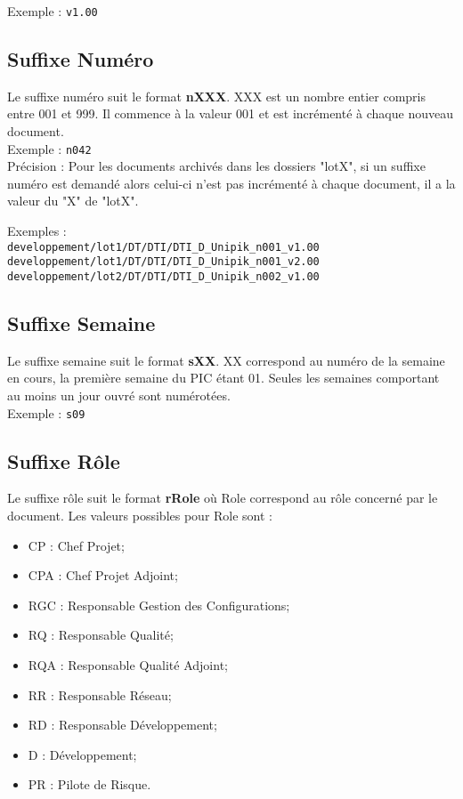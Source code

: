 Exemple : \verb+v1.00+

\subsection{Suffixe Numéro}
\label{suffixe_numero}

Le suffixe numéro suit le format \textbf{nXXX}. XXX est un nombre entier compris entre 001 et 999. Il commence à la valeur 001 et est incrémenté à chaque nouveau document.\\

Exemple : \verb+n042+\\

Précision : Pour les documents archivés dans les dossiers "lotX", si un suffixe numéro est demandé alors celui-ci n'est pas incrémenté à chaque document, il a la valeur du "X" de "lotX".

Exemples :\\ 
\verb+developpement/lot1/DT/DTI/DTI_D_Unipik_n001_v1.00+\\
\verb+developpement/lot1/DT/DTI/DTI_D_Unipik_n001_v2.00+\\
\verb+developpement/lot2/DT/DTI/DTI_D_Unipik_n002_v1.00+

\subsection{Suffixe Semaine}
\label{suffixe_semaine}

Le suffixe semaine suit le format \textbf{sXX}. XX correspond au numéro de la semaine en cours, la première semaine du PIC étant 01. Seules les semaines comportant au moins un jour ouvré sont numérotées.\\

Exemple : \verb+s09+

\subsection{Suffixe Rôle}
\label{suffixe_role}

Le suffixe rôle suit le format \textbf{rRole} où Role correspond au rôle concerné par le document. Les valeurs possibles pour Role sont : 
\begin{itemize}
\item CP : Chef Projet;
\item CPA : Chef Projet Adjoint;
\item RGC : Responsable Gestion des Configurations;
\item RQ : Responsable Qualité;
\item RQA : Responsable Qualité Adjoint;
\item RR : Responsable Réseau;
\item RD : Responsable Développement;
\item D : Développement;
\item PR : Pilote de Risque.\\
\end{itemize}

